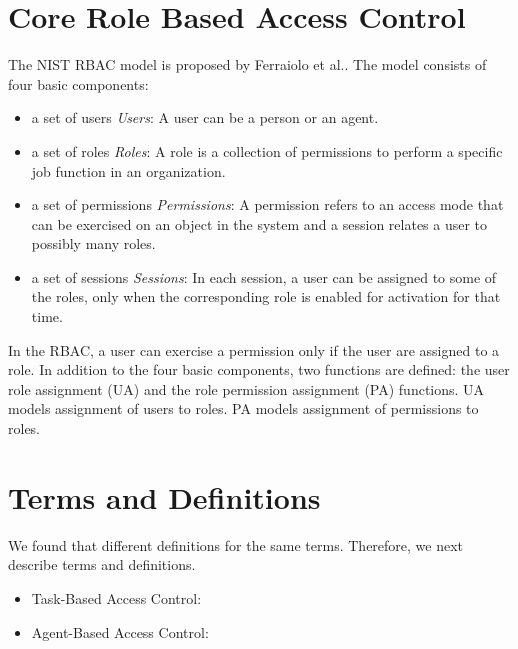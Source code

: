 \section{Core Role Based Access Control} \label{sec:core-rbac}

The NIST RBAC model is proposed by Ferraiolo et al.. The model
consists of four basic components: 

\begin{itemize}
	\item a set of users \emph{Users}: A user can be a person or an agent.
	\item  a set of roles \emph{Roles}: A role is a collection of permissions to perform a specific job function in an organization.
	\item a set of permissions \emph{Permissions}: A permission refers to an access mode that
can be exercised on an object in the system and a session
relates a user to possibly many roles.
	\item a set of sessions \emph{Sessions}: In each session, a
user can be assigned to some of the roles, only when the corresponding role is enabled for activation for that time.		
\end{itemize}

In the RBAC, a user can exercise a permission only if the user are assigned to a role.
In addition to the four basic components, two functions are defined:
the user role assignment (UA) and the role
permission assignment (PA) functions.
UA models assignment of users to roles.
PA models assignment of permissions to roles.



\section{Terms and Definitions} \label{sec:terms}

We found that different definitions for the same terms. Therefore, we next describe
terms and definitions.

\begin{itemize}
	\item Task-Based Access Control:
	\item Agent-Based Access Control:						
\end{itemize}



